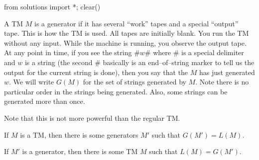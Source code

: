 \begin{python0}
from solutions import *; clear()
\end{python0}

A TM $M$ is a generator if it has several ``work'' tapes and a
special ``output'' tape. This is how the TM is used. All tapes are
initially blank. You run the TM without any input. While the
machine is running, you observe the output tape. At any point in
time, if you see the string $\#w\#$ where $\#$ is a special
delimiter and $w$ is a string 
(the second $\#$ basically is an end--of--string marker to tell us the 
output for the current string is done), then you say that the $M$ has just
generated $w$. We will write $G(M)$ for the set of strings
generated by $M$. Note there is no particular order in the strings
being generated. Also, some strings can be generated more than
once.

Note that this is not more powerful than
the regular TM.

\begin{thm}
\begin{tightlist}
\item If $M$ is a TM, then there is some generators $M'$ such that
$G(M') = L(M)$.
\item If $M'$ is a generator, then there is some TM $M$ such that
$L(M) = G(M')$.
\end{tightlist}
\end{thm}
